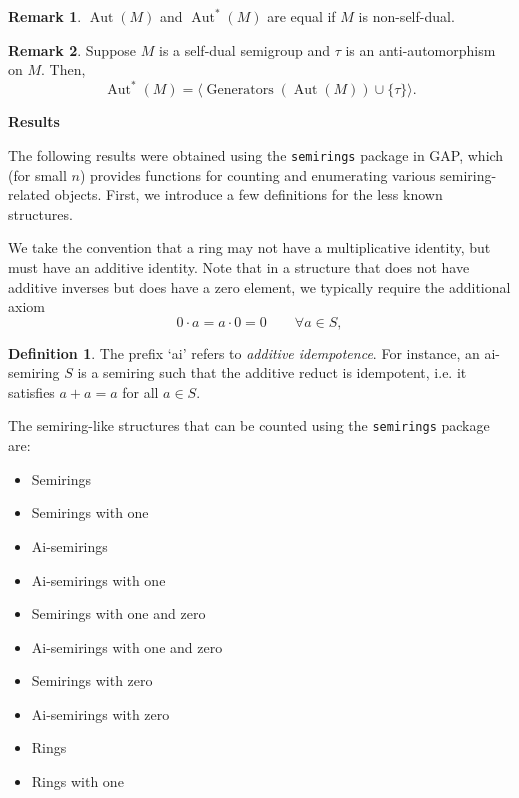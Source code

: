 \documentclass{article}
\theoremstyle{definition}
\newtheorem{definition}{Definition}
\newtheorem{remark}{Remark}
\begin{document}
\begin{remark}
    \(\operatorname{Aut}(M)\) and \(\operatorname{Aut}^*(M)\) are equal if \(M\) is non-self-dual.
\end{remark}

\begin{remark}
    Suppose \(M\) is a self-dual semigroup and \(\tau\) is an anti-automorphism on \(M\). Then, 
    \[\operatorname{Aut}^*(M) = \langle\operatorname{Generators}(\operatorname{Aut}(M)) \cup \{\tau\}\rangle.\]
\end{remark}
\vspace{3em}
\begin{center}
    \textbf{Results}
\end{center}
The following results were obtained using the \texttt{semirings} package in GAP, which (for small \(n\)) provides functions for counting and enumerating various semiring-related objects. First, we introduce a few definitions for the less known structures.

We take the convention that a ring may not have a multiplicative identity, but must have an additive identity. Note that in a structure that does not have additive inverses but does have a zero element, we typically require the additional axiom
\begin{equation}
    \label{eq:rig-axiom}
    0\cdot a=a\cdot0=0\qquad\forall a\in S,
\end{equation}

\begin{definition}
    The prefix `ai' refers to \emph{additive idempotence}. For instance, an ai-semiring \(S\) is a semiring such that the additive reduct is idempotent, i.e. it satisfies \(a + a = a\) for all \(a\in S\).
\end{definition}

The semiring-like structures that can be counted using the \texttt{semirings} package are:

\begin{multicols}{2}
\begin{itemize}
    \item Semirings
    \item Semirings with one
    \item Ai-semirings
    \item Ai-semirings with one
    \item Semirings with one and zero
    \item Ai-semirings with one and zero
    \item Semirings with zero
    \item Ai-semirings with zero
    \item Rings
    \item Rings with one
\end{itemize}
\end{multicols}
\end{document}
